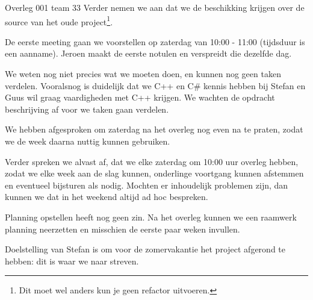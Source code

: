 \documentclass{article}
\begin{document}
\begin{Minutes}{Overleg 001 team 33}
Verder nemen we aan dat we de beschikking krijgen over de source van het oude project\footnote{Dit moet
wel anders kun je geen refactor uitvoeren.}.

De eerste meeting gaan we voorstellen op zaterdag van 10:00 - 11:00 (tijdsduur is een aanname).
Jeroen maakt de eerste notulen en verspreidt die dezelfde dag.

We weten nog niet precies wat we moeten doen, en kunnen nog geen taken verdelen. 
Vooralsnog is duidelijk dat we C++ en C\# kennis hebben bij 
Stefan en Guus wil graag vaardigheden met C++ krijgen. We wachten de opdracht beschrijving
af voor we taken gaan verdelen.

We hebben afgesproken om zaterdag na het overleg nog even na te praten, zodat we de week daarna
nuttig kunnen gebruiken.

Verder spreken we alvast af, dat we elke zaterdag om 10:00 uur 
overleg hebben, zodat we elke week aan de slag kunnen,
onderlinge voortgang kunnen afstemmen en eventueel bijsturen 
als nodig. Mochten er inhoudelijk problemen zijn, dan
kunnen we dat in het weekend altijd ad hoc bespreken.

Planning opstellen heeft nog geen zin. Na het overleg 
kunnen we een raamwerk planning neerzetten en misschien de 
eerste paar weken invullen.

Doelstelling van Stefan is om voor de zomervakantie 
het project afgerond te hebben: dit is waar we naar streven.

\end{Minutes}
\end{document}
